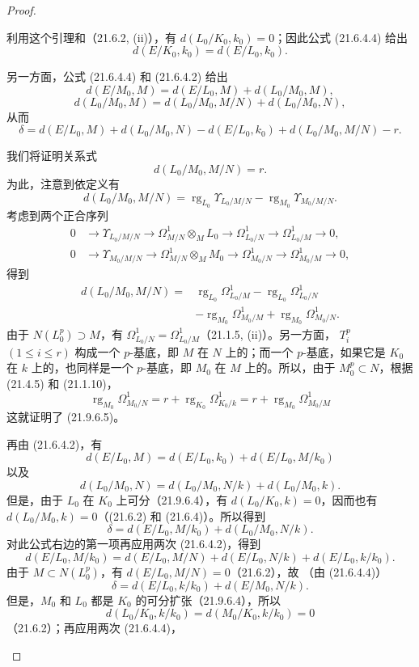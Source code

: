 \begin{proof}
\begin{enumerate}
  利用这个引理和（21.6.2, (ii)），有 $d(L_0/K_0,k_0)=0$；因此公式
  (21.6.4.4) 给出
  \[
    d(E/K_0,k_0)=d(E/L_0,k_0).
  \]

  另一方面，公式 (21.6.4.4) 和 (21.6.4.2) 给出
  \[
    d(E/M_0,M)=d(E/L_0,M)+d(L_0/M_0,M),
  \]
  \[
    d(L_0/M_0,M)=d(L_0/M_0,M/N)+d(L_0/M_0,N),
  \]
  从而
  \[
    \delta=d(E/L_0,M)+d(L_0/M_0,N)-d(E/L_0,k_0)
    +d(L_0/M_0,M/N)-r.
  \]

  我们将证明关系式
  \begin{equation}
  \tag{21.9.6.5}
  \label{0.21.9.6.5-fr}
    d(L_0/M_0,M/N)=r.
  \end{equation}
  为此，注意到依定义有
  \[
    d(L_0/M_0,M/N)
    =\operatorname{rg}_{L_0}\Upsilon_{L_0/M/N}
    -\operatorname{rg}_{M_0}\Upsilon_{M_0/M/N}.
  \]
  考虑到两个正合序列
  \[
  \begin{aligned}
    0&\longrightarrow\Upsilon_{L_0/M/N}
      \longrightarrow\Omega^1_{M/N}\otimes_ML_0
      \longrightarrow\Omega^1_{L_0/N}
      \longrightarrow\Omega^1_{L_0/M}\longrightarrow0,\\
    0&\longrightarrow\Upsilon_{M_0/M/N}
      \longrightarrow\Omega^1_{M/N}\otimes_MM_0
      \longrightarrow\Omega^1_{M_0/N}
      \longrightarrow\Omega^1_{M_0/M}\longrightarrow0,
  \end{aligned}
  \]
  得到
  \[
  \begin{split}
    d(L_0/M_0,M/N)={}&\operatorname{rg}_{L_0}\Omega^1_{L_0/M}
      -\operatorname{rg}_{L_0}\Omega^1_{L_0/N}\\
      &-\operatorname{rg}_{M_0}\Omega^1_{M_0/M}
      +\operatorname{rg}_{M_0}\Omega^1_{M_0/N}.
  \end{split}
  \]
  由于 $N(L_0^p)\supset M$，有
  $\Omega^1_{L_0/N}=\Omega^1_{L_0/M}$（21.1.5, (ii)）。另一方面，
  $T_i^p$ $(1\leqslant i\leqslant r)$ 构成一个 $p$-基底，即 $M$ 在 $N$
  上的；而一个 $p$-基底，如果它是 $K_0$ 在 $k$ 上的，也同样是一个
  $p$-基底，即 $M_0$ 在 $M$ 上的。所以，由于 $M_0^p\subset N$，根据
  (21.4.5) 和 (21.1.10)，
  \[
    \operatorname{rg}_{M_0}\Omega^1_{M_0/N}
    =r+\operatorname{rg}_{K_0}\Omega^1_{K_0/k}
    =r+\operatorname{rg}_{M_0}\Omega^1_{M_0/M}
  \]
  这就证明了 (21.9.6.5)。

  再由 (21.6.4.2)，有
  \[
    d(E/L_0,M)=d(E/L_0,k_0)+d(E/L_0,M/k_0)
  \]
  以及
  \[
    d(L_0/M_0,N)=d(L_0/M_0,N/k)+d(L_0/M_0,k).
  \]
  但是，由于 $L_0$ 在 $K_0$ 上可分（21.9.6.4），有
  $d(L_0/K_0,k)=0$，因而也有 $d(L_0/M_0,k)=0$（(21.6.2) 和
  (21.6.4)）。所以得到
  \[
    \delta=d(E/L_0,M/k_0)+d(L_0/M_0,N/k).
  \]
  对此公式右边的第一项再应用两次 (21.6.4.2)，得到
  \[
    d(E/L_0,M/k_0)=d(E/L_0,M/N)+d(E/L_0,N/k)+d(E/L_0,k/k_0).
  \]
  由于 $M\subset N(L_0^p)$，有 $d(E/L_0,M/N)=0$（21.6.2），故
  （由 (21.6.4.4)）
  \[
    \delta=d(E/L_0,k/k_0)+d(E/M_0,N/k).
  \]
  但是，$M_0$ 和 $L_0$ 都是 $K_0$ 的可分扩张（21.9.6.4），所以
  \[
    d(L_0/K_0,k/k_0)=d(M_0/K_0,k/k_0)=0
  \]
  （21.6.2）；再应用两次 (21.6.4.4)，


\end{enumerate}
\end{proof}
